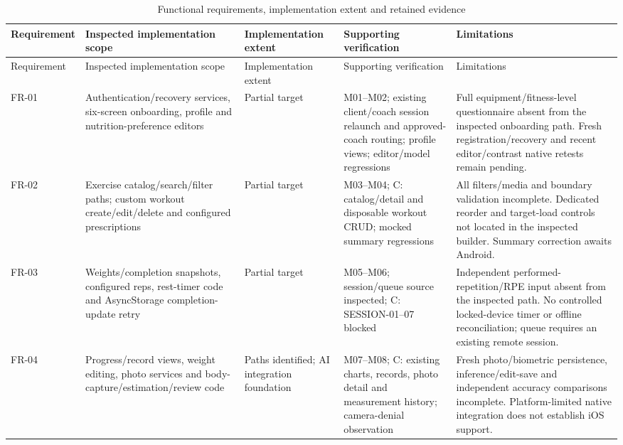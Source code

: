 \documentclass[12pt,a4paper,openany]{report}
\begin{document}
\begingroup
\footnotesize
\setlength{\tabcolsep}{3pt}
\renewcommand{\arraystretch}{1.20}
\setlength{\LTpre}{5pt}
\setlength{\LTpost}{10pt}
\begin{longtable}{|L{1.15cm}|L{3.35cm}|L{2.05cm}|L{3.95cm}|L{4.10cm}|}
\caption{Functional requirements, implementation extent and retained evidence}\label{tab:implementation-evidence} \\
\hline
{}
Requirement & Inspected implementation scope & Implementation extent & Supporting verification & Limitations \\ \hline
\endfirsthead
\hline
{}
Requirement & Inspected implementation scope & Implementation extent & Supporting verification & Limitations \\ \hline
\endhead
FR-01 & Authentication\slash{}recovery services, six-screen onboarding, profile and nutrition-preference editors & Partial target & M01--M02; existing client\slash{}coach session relaunch and approved-coach routing; profile views; editor\slash{}model regressions & Full equipment\slash{}fitness-level questionnaire absent from the inspected onboarding path. Fresh registration\slash{}recovery and recent editor\slash{}contrast native retests remain pending. \\ \hline
FR-02 & Exercise catalog\slash{}search\slash{}filter paths; custom workout create\slash{}edit\slash{}delete and configured prescriptions & Partial target & M03--M04; C: catalog\slash{}detail and disposable workout CRUD; mocked summary regressions & All filters\slash{}media and boundary validation incomplete. Dedicated reorder and target-load controls not located in the inspected builder. Summary correction awaits Android. \\ \hline
FR-03 & Weights\slash{}completion snapshots, configured reps, rest-timer code and AsyncStorage completion-update retry & Partial target & M05--M06; session\slash{}queue source inspected; C: SESSION-01--07 blocked & Independent performed-repetition\slash{}RPE input absent from the inspected path. No controlled locked-device timer or offline reconciliation; queue requires an existing remote session. \\ \hline
FR-04 & Progress\slash{}record views, weight editing, photo services and body-capture\slash{}estimation\slash{}review code & Paths identified; AI integration foundation & M07--M08; C: existing charts, records, photo detail and measurement history; camera-denial observation & Fresh photo\slash{}biometric persistence, inference\slash{}edit-save and independent accuracy comparisons incomplete. Platform-limited native integration does not establish iOS support. \\ \hline

\end{longtable}
\end{document}
